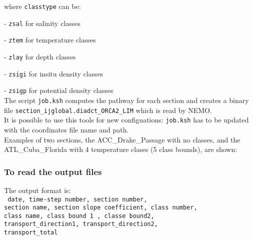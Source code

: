 \documentclass[../tex_main/NEMO_manual]{subfiles}
\begin{document}
\noindent where \texttt{classtype} can be:

 - \texttt{zsal}  for          salinity classes

 - \texttt{ztem}  for       temperature classes

 - \texttt{zlay}  for             depth classes

 - \texttt{zsigi} for    insitu density classes

 - \texttt{zsigp} for potential density classes \\
  
The script \texttt{job.ksh} computes the pathway for each section and 
creates a binary file \texttt{section\_ijglobal.diadct\_ORCA2\_LIM} which is read by NEMO. \\

It is possible to use this tools for new configuations: \texttt{job.ksh} has to be updated with 
the coordinates file name and path. \\

Examples of two sections, the ACC\_Drake\_Passage with no classes, and the ATL\_Cuba\_Florida with 
4 temperature clases (5 class bounds), are shown: \\

\subsubsection{To read the output files}

The output format is: \\
{\scriptsize \texttt{
date, time-step number, section number,                \\
section name, section slope coefficient, class number, \\
class name, class bound 1 , classe bound2,             \\
transport\_direction1, transport\_direction2,          \\
transport\_total}}                                     \\
\end{document}
